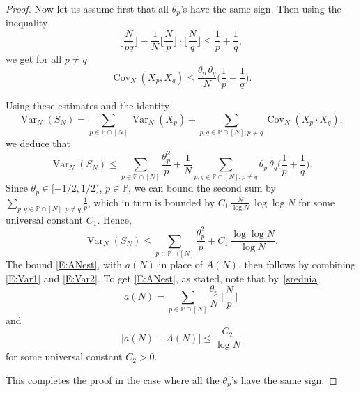 \documentclass[10pt,a4paper]{amsart}
\newcommand{\Cov}{\operatorname{Cov}}
\newcommand{\Var}{\operatorname{Var}}
\renewcommand{\P}{{\mathbb P}}
\begin{document}
\begin{proof}
	Now let us assume first  that all $\theta_p$'s have the same sign. Then using the inequality
	$$
	\Big\lfloor\frac{N}{pq}\Big\rfloor - \frac{1}{N}\Big\lfloor\frac{N}{p}\Big\rfloor \cdot \Big\lfloor\frac{N}{q}\Big\rfloor \leq \frac{1}{p}+\frac{1}{q},
	$$
	we get for all $p\neq q$
	$$
	\Cov_N(X_p,X_q) \leq \frac{\theta_p\, \theta_q}{N}\Big(\frac{1}{p}+\frac{1}{q}\Big).
	$$
	
	Using these estimates and the identity
	$$
	\Var_N(S_N)=\sum_{p\in \P\cap[N]} \Var_N(X_p)+\sum_{p,q\in \P\cap [N], p\neq q} \Cov_N(X_p\cdot X_q),
	$$
	we deduce that
	$$
	\Var_N(S_N)\leq  \sum_{p\in \P\cap[N]} \frac{\theta_p^2}{p}+
	\frac{1}{N}\sum_{p,q\in \P\cap [N], p\neq q} \theta_p\, \theta_q\Big(\frac{1}{p}+\frac{1}{q}\Big).
	$$
	Since $\theta_p\in [-1/2,1/2)$, $p\in \P$, we can bound the second sum by $\sum_{p,q\in \P\cap [N], p\neq q}\frac{1}{p}$, which in turn is bounded by $C_1 \, \frac{N}{\log{N}}\,  \log\log{N}$ for some universal constant $C_1$. Hence,
	\begin{equation}\label{E:Var2}
		\Var_N(S_N)\leq  \sum_{p\in \P\cap[N]} \frac{\theta_p^2}{p}+C_1\, \frac{\log\log{N}}{\log{N}}.
	\end{equation}
	The bound \eqref{E:ANest}, with $a(N)$  in place of $A(N)$,  then follows by combining \eqref{E:Var1} and  \eqref{E:Var2}.
	To get  \eqref{E:ANest}, as stated,  note that by~\eqref{srednia}
$$
		a(N)=\sum_{p\in \P\cap [N]}  \frac{\theta_p}{N}\, \Big\lfloor\frac{N}{p}\Big\rfloor
$$
	and
	$$
	|a(N)-A(N)|\leq \frac{C_2}{\log{N}}
	$$
	for some universal constant $C_2>0$.
	
	This completes the proof in the case where all the $\theta_p$'s have the same sign.
	

\end{proof}
\end{document}
